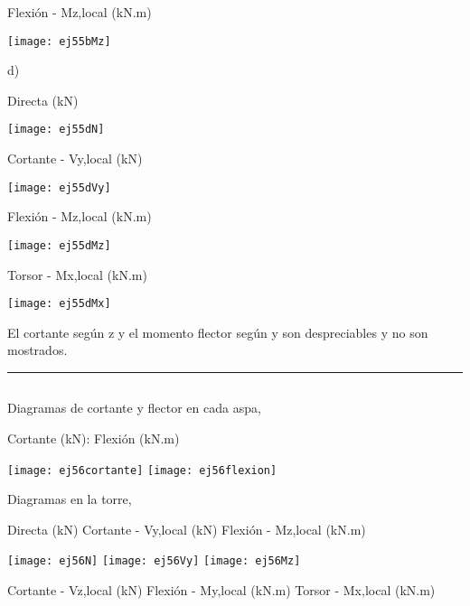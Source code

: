 Flexión - Mz,local (kN.m)

	\begin{center}
	\texttt{[image: ej55bMz]}
\end{center}

d)

Directa (kN)

	\begin{center}
	\texttt{[image: ej55dN]}
\end{center}


Cortante - Vy,local (kN)

\begin{center}
	\texttt{[image: ej55dVy]}
\end{center}

Flexión - Mz,local (kN.m)

\begin{center}
	\texttt{[image: ej55dMz]}
\end{center}


Torsor - Mx,local (kN.m)


\begin{center}
	\texttt{[image: ej55dMx]}
\end{center}

El cortante según z y el momento flector según y son despreciables y no son mostrados. 

\hrule

\subsection{}

Diagramas de cortante y flector en cada aspa,

Cortante (kN):  \qquad 
Flexión (kN.m)

\texttt{[image: ej56cortante]}
\texttt{[image: ej56flexion]}


Diagramas en la torre,

\noindent
Directa (kN)
\quad
Cortante - Vy,local (kN)
\quad
Flexión - Mz,local (kN.m)

\texttt{[image: ej56N]}
\texttt{[image: ej56Vy]}
\texttt{[image: ej56Mz]}


\noindent
Cortante - Vz,local (kN)
\quad
Flexión - My,local (kN.m)
\quad
Torsor - Mx,local (kN.m)

